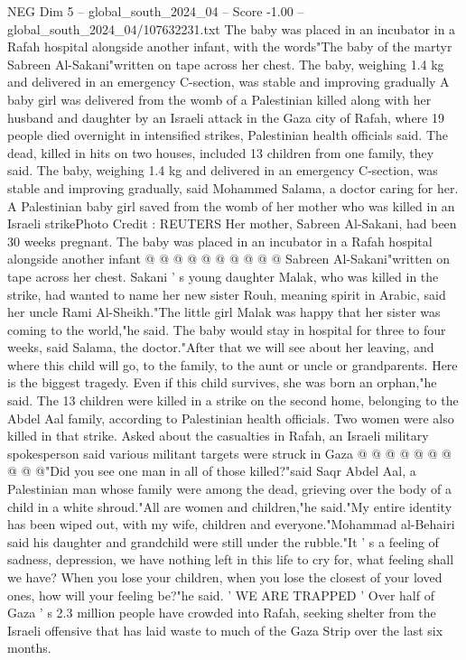 \begin{textsample}{NEG Dim 5 – global\_south\_2024\_04 – Score -1.00 – global\_south\_2024\_04/107632231.txt}  \label{ex:f5_neg_113}
The baby was placed in an incubator in a Rafah hospital alongside another infant, with the words"The baby of the martyr Sabreen Al-Sakani"written on tape across her chest.
The baby, weighing 1.4 kg and delivered in an emergency C-section, was stable and improving gradually A baby girl was delivered from the womb of a Palestinian killed along with her husband and daughter by an Israeli attack in the Gaza city of Rafah, where 19 people died overnight in intensified strikes, Palestinian health officials said.
The dead, killed in hits on two houses, included 13 children from one family, they said.
The baby, weighing 1.4 kg and delivered in an emergency C-section, was stable and improving gradually, said Mohammed Salama, a doctor caring for her.
A Palestinian baby girl saved from the womb of her mother who was killed in an Israeli strikePhoto Credit : REUTERS Her mother, Sabreen Al-Sakani, had been 30 weeks pregnant.
The baby was placed in an incubator in a Rafah hospital alongside another infant @ @ @ @ @ @ @ @ @ @ Sabreen Al-Sakani"written on tape across her chest.
Sakani ' s young daughter Malak, who was killed in the strike, had wanted to name her new sister Rouh, meaning spirit in Arabic, said her uncle Rami Al-Sheikh."The little girl Malak was happy that her sister was coming to the world,"he said.
The baby would stay in hospital for three to four weeks, said Salama, the doctor."After that we will see about her leaving, and where this child will go, to the family, to the aunt or uncle or grandparents.
Here is the biggest tragedy.
Even if this child survives, she was born an orphan,"he said.
The 13 children were killed in a strike on the second home, belonging to the Abdel Aal family, according to Palestinian health officials.
Two women were also killed in that strike.
Asked about the casualties in Rafah, an Israeli military spokesperson said various militant targets were struck in Gaza @ @ @ @ @ @ @ @ @ @"Did you see one man in all of those killed?"said Saqr Abdel Aal, a Palestinian man whose family were among the dead, grieving over the body of a child in a white shroud."All are women and children,"he said."My entire identity has been wiped out, with my wife, children and everyone."Mohammad al-Behairi said his daughter and grandchild were still under the rubble."It ' s a feeling of sadness, depression, we have nothing left in this life to cry for, what feeling shall we have?
When you lose your children, when you lose the closest of your loved ones, how will your feeling be?"he said. ' WE ARE TRAPPED ' Over half of Gaza ' s 2.3 million people have crowded into Rafah, seeking shelter from the Israeli offensive that has laid waste to much of the Gaza Strip over the last six months.

\end{textsample}
